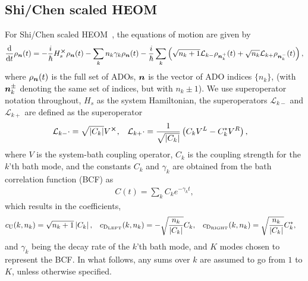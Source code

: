 \documentclass{article}
\begin{document}
\subsection{Shi/Chen scaled HEOM}
For Shi/Chen scaled HEOM~\cite{chenQuantumRateDynamics2009a}, the equations of motion are given by
\begin{align}
    \frac{{\rm d}}{{\rm d} t}\rho_{\boldsymbol{n}}(t) = -\frac{i}{\hbar}H_s^{\cross}\rho_{\boldsymbol{n}}(t)  - \sum_k n_k\gamma_k \rho_{\boldsymbol{n}}(t) 
    -\frac{i}{\hbar} \sum_k\left( \sqrt{n_k+1}\mathcal{L}_{k-}\rho_{\boldsymbol{n}_k^+}(t) +  \sqrt{n_k}\mathcal{L}_{k+}\rho_{\boldsymbol{n}_k^-}(t)\right),
\end{align}
where $\rho_{\boldsymbol{n}}(t)$ is the full set of ADOs, $\boldsymbol{n}$ is the vector of ADO indices $\{n_k\}$, (with $\boldsymbol{n}_k^{\pm}$ denoting the same set of indices, but with $n_k\pm1$).
We use superoperator notation throughout, $H_s$ as the system Hamiltonian, the superoperators $\mathcal{L}_{k-}$ and $\mathcal{L}_{k+}$ are defined as
the superoperator 
\begin{align}
    \mathcal{L}_{k-}\cdot &= \sqrt{|C_k|}V^{\cross}, & \mathcal{L}_{k+}\cdot &= \frac{1}{\sqrt{|C_k|}}\left(C_k V^{L} - C_k^* V^{R}\right),
\end{align}
where $V$ is the system-bath coupling operator, $C_k$ is the coupling strength for the $k$'th bath mode, and the constants $C_k$ and $\gamma_k$ are obtained from the bath correlation function (BCF) as
\begin{align}
    C(t) = \sum_k C_k e^{-\gamma_k t},
\end{align}
which results in the coefficients,
\begin{align}
    c_{\rm U}(k,n_k) &= \sqrt{n_k+1}\left|C_k\right|, & c_{\rm D_{LEFT}}(k,n_k) &= -\sqrt{\frac{n_k}{{|C_k|}}}C_k, & c_{\rm D_{RIGHT}}(k,n_k) &= \sqrt{\frac{n_k}{{|C_k|}}}C_k^*,
\end{align}
and $\gamma_k$ being the decay rate of the $k$'th bath mode, and $K$ modes chosen to represent the BCF. In what follows, any sums over $k$ are assumed to go from $1$ to $K$, unless otherwise specified.
\end{document}
